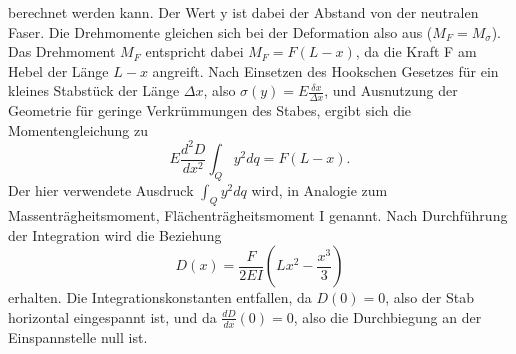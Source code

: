 berechnet werden kann.
Der Wert y ist dabei der Abstand von der neutralen Faser. Die Drehmomente gleichen sich bei der Deformation also aus ($M_F=M_{\sigma}$). Das Drehmoment $M_F$ entspricht dabei $M_F=F(L-x)$, da die Kraft F am Hebel der Länge $L-x$ angreift. Nach Einsetzen des Hookschen Gesetzes für ein kleines Stabstück der Länge $\Delta x$, also $\sigma(y)=E\frac{\delta x}{\Delta x}$, und Ausnutzung der Geometrie für geringe Verkrümmungen des Stabes, ergibt sich die Momentengleichung zu 
\begin{equation}
    E\frac{d^2D}{dx^2}\int_Qy^2dq = F(L-x).
\end{equation}
Der hier verwendete Ausdruck $\int_Qy^2dq$ wird, in Analogie zum Massenträgheitsmoment, Flächenträgheitsmoment I genannt. Nach Durchführung der Integration wird die Beziehung 
\begin{equation}
    D(x)=\frac{F}{2EI}(Lx^2-\frac{x^3}{3})
\end{equation}
erhalten. Die Integrationskonstanten entfallen, da $D(0)=0$, also der Stab horizontal eingespannt ist, und da $\frac{dD}{dx}(0)=0$, also die Durchbiegung an der Einspannstelle null ist.

